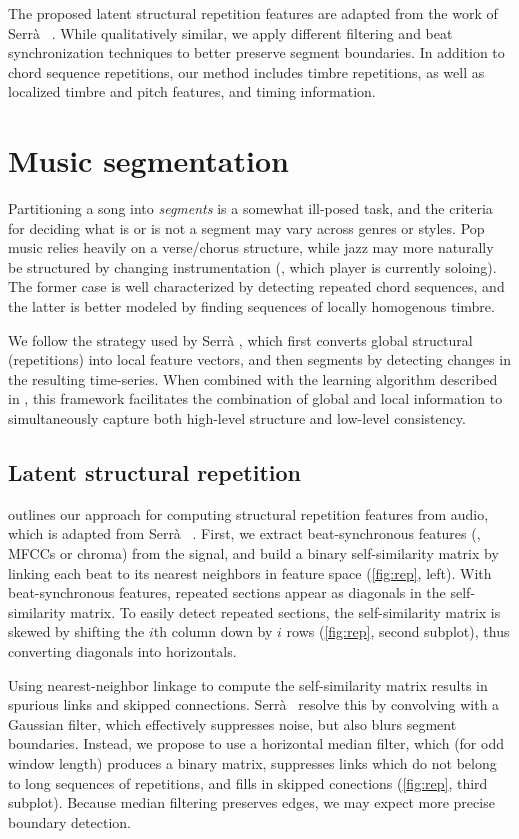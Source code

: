 \documentclass{article}
\begin{document}
The proposed latent structural repetition features are adapted from the work of Serr\`{a}
\etal~\cite{serra2012unsupervised}. While qualitatively similar, we apply different filtering and
beat synchronization techniques to better preserve segment boundaries. 
In addition to chord sequence repetitions, our method includes timbre repetitions, as well as 
localized timbre and pitch features, and timing information.

\section{Music segmentation}
\label{sec:features}
Partitioning a song into \emph{segments} is a somewhat ill-posed task, and the criteria for deciding what is or
is not a segment may vary across genres or styles.  Pop music relies heavily on a verse/chorus structure, while jazz
may more naturally be structured by changing instrumentation (\ie, which player is currently soloing).  
The former case is well characterized by detecting repeated chord sequences, and the latter is better modeled
by finding sequences of locally homogenous timbre.

We follow the strategy used by Serr\`{a} \etal, which first converts global structural (repetitions) into
local feature vectors, and then segments by detecting changes in the resulting time-series. 
When combined with the learning algorithm described in , this framework facilitates the 
combination of global and local information to simultaneously capture both high-level structure and low-level 
consistency.

\subsection{Latent structural repetition}
 outlines our approach for computing structural repetition features from audio, which is adapted from
Serr\`{a} \etal~\cite{serra2012unsupervised}.  First, we extract beat-synchronous features (\eg, MFCCs or chroma) 
from the signal, and build a binary self-similarity matrix by linking each beat to its nearest neighbors in feature
space (\cref{fig:rep}, left). With beat-synchronous features, repeated sections appear as diagonals in the self-similarity
matrix. To easily detect repeated sections, the self-similarity matrix is skewed by shifting the $i$th column down by $i$ rows
(\cref{fig:rep}, second subplot), thus converting diagonals into horizontals.

Using nearest-neighbor linkage to compute the self-similarity matrix results in spurious links and skipped connections. 
Serr\`{a}~\etal{} resolve this by convolving with a Gaussian filter, which effectively suppresses noise, but also blurs
segment boundaries. Instead, we propose to use a horizontal median filter, which (for odd window length) produces a binary matrix,
suppresses links which do not belong to long sequences of repetitions, and fills in skipped conections (\cref{fig:rep}, third
subplot). Because median filtering preserves edges, we may expect more precise boundary detection.
\end{document}
